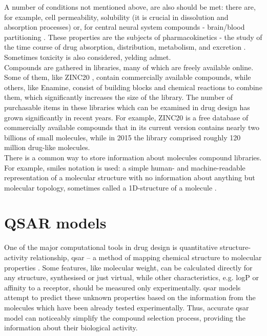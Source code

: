 A number of conditions not mentioned above, are also should be met: there are, for example, cell permeability, solubility (it is crucial in dissolution and absorption processes) or, for central neural system compounds - brain/blood partitioning {\cite{Jorgensen2004TheDiscovery}}.
These properties are the subjects of pharmacokinetics - the study of the
time course of drug absorption, distribution, metabolism, and excretion {\cite{Atkinson2009CHAPTERPHARMACOKINETICS}}. Sometimes toxicity is also considered, yelding \acrshort{admet}. \\

Compounds are gathered in libraries, many of which are freely available online.
Some of them, like ZINC20 {\cite{Irwin2020ZINC20Discovery}}, contain commercially available compounds, while others, like Enamine, consist of building blocks and chemical reactions to combine them, which significantly increases the size of the library.
The number of purchasable items in these libraries which can be examined in drug design has grown significantly in recent years.
For example, ZINC20 {\cite{Irwin2020ZINC20Discovery}} is a free database of commercially available compounds that in its current version contains nearly two billions of small molecules, while in 2015 {\cite{Sterling2015ZINCEveryone}} the library comprised roughly 120 million drug-like molecules.\\

There is a common way to store information about molecules compound libraries.
For example, \acrshort{smiles} notation is used: a simple human- and machine-readable representation of a molecular structure with no information about anything but molecular topology, sometimes called a 1D-structure of a molecule \cite{OskJonsdottir2005PredictionCandidates}.\\

\section{QSAR models}
One of the major computational tools in drug design is quantitative structure-activity relationship, \acrshort{qsar} -- a method of mapping chemical structure to molecular properties {\cite{Polanski2009ReceptorInteractions}}. 
Some features, like molecular weight, can be calculated directly for any structure, synthesised or just virtual, while other characteristics, e.g. logP or affinity to a receptor, should be measured only experimentally.
\acrshort{qsar} models attempt to predict these unknown properties based on the information from the molecules which have been already tested experimentally.
Thus, accurate \acrshort{qsar} model can noticeably simplify the compound selection process, providing the information about their biological activity.\\

